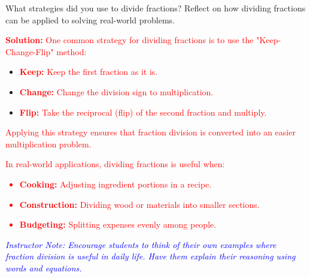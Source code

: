 \documentclass[12pt]{article}
\begin{document}
\vspace{1em}
\begin{tcolorbox}[colframe=black!60, colback=white, 
coltitle=black, colbacktitle=black!15, fonttitle=\bfseries\Large, 
title=Reflection, halign title=center, left=10pt, right=10pt, top=10pt, bottom=100pt]
What strategies did you use to divide fractions? Reflect on how dividing fractions can be applied to solving real-world problems.

\textcolor{red}{\textbf{Solution:} One common strategy for dividing fractions is to use the "Keep-Change-Flip" method:}
\begin{itemize}
    \item \textcolor{red}{\textbf{Keep:} Keep the first fraction as it is.}
    \item \textcolor{red}{\textbf{Change:} Change the division sign to multiplication.}
    \item \textcolor{red}{\textbf{Flip:} Take the reciprocal (flip) of the second fraction and multiply.}
\end{itemize}
\textcolor{red}{Applying this strategy ensures that fraction division is converted into an easier multiplication problem.}

\textcolor{red}{In real-world applications, dividing fractions is useful when:
\begin{itemize}
    \item \textbf{Cooking:} Adjusting ingredient portions in a recipe.
    \item \textbf{Construction:} Dividing wood or materials into smaller sections.
    \item \textbf{Budgeting:} Splitting expenses evenly among people.
\end{itemize}
}

\textcolor{blue}{\textit{Instructor Note: Encourage students to think of their own examples where fraction division is useful in daily life. Have them explain their reasoning using words and equations.}}
\end{tcolorbox}
\end{document}
